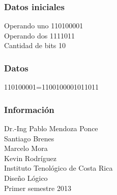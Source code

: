 \documentclass{beamer}
\begin{document}
\begin{frame}\frametitle{Datos iniciales}Operando uno 110100001\\Operando dos 1111011\\Cantidad de bits 10\end{frame}
\begin{frame}\frametitle{Datos}  110100001=1100100001011011\end{frame}
\begin{frame}\frametitle{Informaci\'on}Dr.-Ing Pablo Mendoza Ponce \\ Santiago Brenes \\ Marcelo Mora \\ Kevin Rodr\'iguez \\ Instituto Tenol\'ogico de Costa Rica \\ Dise\~{n}o L\'ogico \\ Primer semestre 2013\end{frame}
\end{document}
